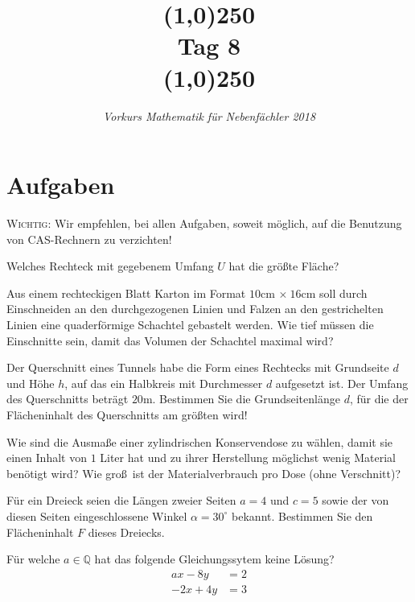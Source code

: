 \documentclass[11pt]{article}
\begin{document}
\title{\line(1,0){250}\\Tag 8\\\line(1,0){250}}
\date{}
\author{\itshape Vorkurs Mathematik für Nebenfächler 2018}
\maketitle

\section*{Aufgaben}
\textsc{Wichtig:} Wir empfehlen, bei allen Aufgaben, soweit möglich, auf die Benutzung von CAS-Rechnern zu verzichten!
\begin{task}
	 Welches Rechteck mit gegebenem Umfang $U$ hat die gr\"o\ss te Fl\"ache?
\end{task}
\begin{task}
	Aus einem rechteckigen Blatt Karton im Format $10$cm $\times \ 16$cm soll durch Einschneiden an den durchgezogenen Linien und Falzen an den gestrichelten Linien eine quaderf\"ormige Schachtel gebastelt werden. Wie tief m\"ussen die Einschnitte sein, damit das Volumen der Schachtel maximal wird? 
\end{task}
\begin{task}
	Der Querschnitt eines Tunnels habe die Form eines Rechtecks mit Grundseite $d$ und H\"ohe $h$, auf das ein Halbkreis mit Durchmesser $d$ aufgesetzt ist. Der Umfang des Querschnitts betr\"agt
	$20$m. Bestimmen Sie die Grundseitenl\"ange $d$, f\"ur die der Fl\"acheninhalt des Querschnitts am gr\"o\ss ten wird!
\end{task}
\begin{task}
	Wie sind die Ausma\ss e einer zylindrischen Konservendose zu w\"ahlen, damit sie einen Inhalt von $1$ Liter hat und zu ihrer Herstellung m\"oglichst wenig Material ben\"otigt wird? Wie gro\ss \ ist
	der Materialverbrauch pro Dose (ohne Verschnitt)?
\end{task}
\dotfill
\begin{task}
	F\"ur ein Dreieck seien die L\"angen zweier Seiten $a=4$ und $c=5$ sowie
	der von diesen Seiten eingeschlossene Winkel $\alpha=30^\circ$ bekannt.
	Bestimmen Sie den Fl\"acheninhalt $F$ dieses Dreiecks.
\end{task}
\begin{task}
	Für welche $a\in \mathbb{Q}$ hat das folgende Gleichungssytem keine Lösung?
	\begin{align*}
		ax-8y&= 2\\
		-2x+4y&=3
	\end{align*}
\end{task}
\end{document}
